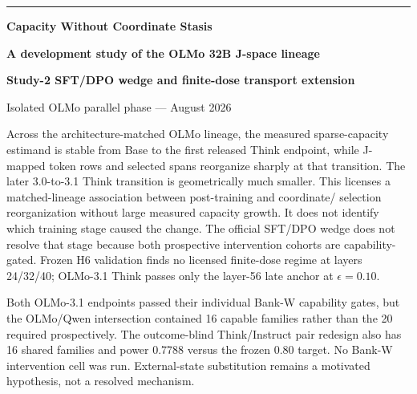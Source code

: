 \documentclass[11pt]{article}
\begin{document}
\hypersetup{pageanchor=false}

\begin{titlepage}
\thispagestyle{empty}
\vspace*{0.35in}
{\color{violetdark}\rule{\textwidth}{2.2pt}}
\vspace{0.32in}

{\Huge\bfseries\color{ink} Capacity Without Coordinate Stasis\par}
\vspace{0.10in}
{\LARGE\bfseries\color{violetdark} A development study of the OLMo 32B J-space lineage\par}
\vspace{0.08in}
{\large\bfseries Study-2 SFT/DPO wedge and finite-dose transport extension\par}

\vspace{0.38in}
{\large Isolated OLMo parallel phase --- August 2026\par}

\vspace{0.35in}
\begin{resultbox}[title={Central finding}]
Across the architecture-matched OLMo lineage, the measured sparse-capacity
estimand is stable from Base to the first released Think endpoint, while
J-mapped token rows and selected spans reorganize sharply at that transition.
The later 3.0-to-3.1 Think transition is geometrically much smaller. This
licenses a matched-lineage association between post-training and coordinate/
selection reorganization without large measured capacity growth. It does not
identify which training stage caused the change. The official SFT/DPO wedge
does not resolve that stage because both prospective intervention cohorts are
capability-gated. Frozen H6 validation finds no licensed finite-dose regime at
layers 24/32/40; OLMo-3.1 Think passes only the layer-56 late anchor at
$\epsilon=0.10$.
\end{resultbox}

\vspace{0.18in}
\begin{warningbox}[title={The decisive externalization experiment did not open}]
Both OLMo-3.1 endpoints passed their individual Bank-W capability gates, but
the OLMo/Qwen intersection contained 16 capable families rather than the 20
required prospectively. The outcome-blind Think/Instruct pair redesign also
has 16 shared families and power 0.7788 versus the frozen 0.80 target. No
Bank-W intervention cell was run. External-state substitution remains a
motivated hypothesis, not a resolved mechanism.
\end{warningbox}


\end{titlepage}
\end{document}
